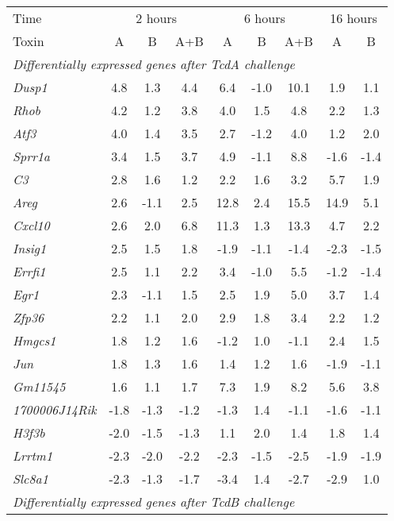 \begin{table}[h!]
\begin{center}
\begin{tabular}{ l c c c | c c c | c c }
Time & \multicolumn{3}{c}{2 hours} & \multicolumn{3}{c}{6 hours} & \multicolumn{2}{c}{16 hours}\\
Toxin & A & B & A+B & A & B & A+B & A & B \\
\multicolumn{9}{l}{\textit{Differentially expressed genes after TcdA challenge}} \\ \hline
\textit{Dusp1} & 4.8 & 1.3 & 4.4 & 6.4 & -1.0 & 10.1 & 1.9 & 1.1 \\
\textit{Rhob}  & 4.2 & 1.2 & 3.8 & 4.0 & 1.5 & 4.8  & 2.2 & 1.3 \\
\textit{Atf3}  & 4.0 & 1.4 & 3.5 & 2.7 & -1.2 & 4.0 & 1.2 & 2.0 \\
\textit{Sprr1a} & 3.4 & 1.5 & 3.7 & 4.9 & -1.1 & 8.8 & -1.6 & -1.4 \\
\textit{C3}  & 2.8 & 1.6 & 1.2 & 2.2 & 1.6 & 3.2 & 5.7 & 1.9 \\
\textit{Areg} & 2.6 & -1.1 & 2.5 & 12.8 & 2.4 & 15.5 & 14.9 & 5.1 \\
\textit{Cxcl10} & 2.6 & 2.0 & 6.8 & 11.3 & 1.3 & 13.3 & 4.7 & 2.2 \\
\textit{Insig1} & 2.5 & 1.5 & 1.8 & -1.9 & -1.1 & -1.4 & -2.3 & -1.5 \\
\textit{Errfi1} & 2.5 & 1.1 & 2.2 & 3.4 & -1.0 & 5.5 & -1.2 & -1.4 \\
\textit{Egr1} & 2.3 & -1.1 & 1.5 & 2.5 & 1.9 & 5.0 & 3.7 & 1.4 \\
\textit{Zfp36} & 2.2 & 1.1 & 2.0 & 2.9 & 1.8 & 3.4 & 2.2 & 1.2 \\
\textit{Hmgcs1} & 1.8 & 1.2 & 1.6 & -1.2 & 1.0 & -1.1 & 2.4 & 1.5 \\
\textit{Jun} & 1.8 & 1.3 & 1.6 & 1.4 & 1.2 & 1.6 & -1.9 & -1.1 \\
\textit{Gm11545} & 1.6 & 1.1 & 1.7 & 7.3 & 1.9 & 8.2 & 5.6 & 3.8 \\
\textit{1700006J14Rik} & -1.8 & -1.3 & -1.2 & -1.3 & 1.4 & -1.1 & -1.6 & -1.1 \\
\textit{H3f3b} & -2.0 & -1.5 & -1.3 & 1.1 & 2.0 & 1.4 & 1.8 & 1.4 \\
\textit{Lrrtm1} & -2.3 & -2.0 & -2.2 & -2.3 & -1.5 & -2.5 & -1.9 & -1.9 \\
\textit{Slc8a1} & -2.3 & -1.3 & -1.7 & -3.4 & 1.4 & -2.7 & -2.9 & 1.0 \\
\multicolumn{9}{l}{\textit{Differentially expressed genes after TcdB challenge}} \\ \hline

\end{tabular}
\end{center}
\end{table}

